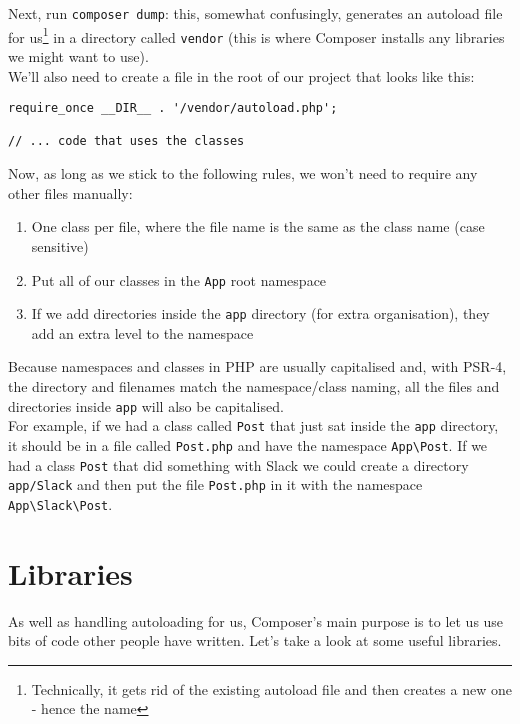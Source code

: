 Next, run \texttt{composer dump}: this, somewhat confusingly, generates an autoload file for us\footnote{Technically, it gets rid of the existing autoload file and then creates a new one - hence the name} in a directory called \texttt{vendor} (this is where Composer installs any libraries we might want to use).
\\

We'll also need to create a file in the root of our project that looks like this:

\begin{verbatim}
require_once __DIR__ . '/vendor/autoload.php';

// ... code that uses the classes
\end{verbatim}

Now, as long as we stick to the following rules, we won't need to require any other files manually:

\begin{enumerate}
    \item One class per file, where the file name is the same as the class name (case sensitive)
    \item Put all of our classes in the \texttt{App} root namespace
    \item If we add directories inside the \texttt{app} directory (for extra organisation), they add an extra level to the namespace
\end{enumerate}

Because namespaces and classes in PHP are usually capitalised and, with PSR-4, the directory and filenames match the namespace/class naming, all the files and directories inside \texttt{app} will also be capitalised.
\\

For example, if we had a class called \texttt{Post} that just sat inside the \texttt{app} directory, it should be in a file called \texttt{Post.php} and have the namespace \texttt{App\textbackslash Post}. If we had a class \texttt{Post} that did something with Slack we could create a directory \texttt{app/Slack} and then put the file \texttt{Post.php} in it with the namespace \texttt{App\textbackslash Slack\textbackslash Post}.



\section{Libraries}

As well as handling autoloading for us, Composer's main purpose is to let us use bits of code other people have written. Let's take a look at some useful libraries.
\\

